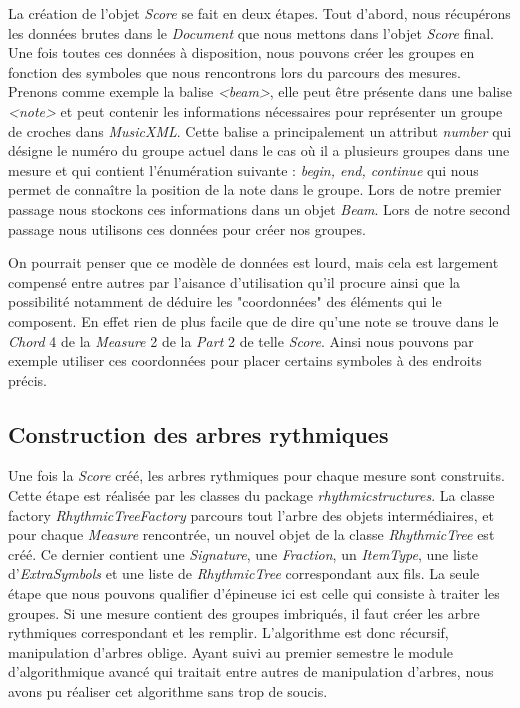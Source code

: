 \par
La création de l'objet \emph{Score} se fait en deux étapes. Tout d'abord, nous récupérons les données brutes dans le \emph{Document} que nous mettons dans l'objet \emph{Score} final. Une fois toutes ces données à disposition, nous pouvons créer les groupes en fonction des symboles que nous rencontrons lors du parcours des mesures. Prenons comme exemple la balise \emph{<beam>}, elle peut être présente dans une balise \emph{<note>} et peut contenir les informations nécessaires pour représenter un groupe de croches dans \emph{MusicXML}. Cette balise a principalement un attribut \emph{number} qui désigne le numéro du groupe actuel dans le cas où il a plusieurs groupes dans une mesure et qui contient l’énumération suivante : \emph{begin, end, continue} qui nous permet de connaître la position de la note dans le groupe. Lors de notre premier passage nous stockons ces informations dans un objet \emph{Beam}. Lors de notre second passage nous utilisons ces données pour créer nos groupes.


\par
On pourrait penser que ce modèle de données est lourd, mais cela est largement compensé entre autres par l'aisance d'utilisation qu'il procure ainsi que la possibilité notamment de déduire les "coordonnées" des éléments qui le composent. En effet rien de plus facile que de dire qu'une note se trouve dans le \emph{Chord} 4 de la \emph{Measure} 2 de la \emph{Part} 2 de telle \emph{Score}. Ainsi nous pouvons par exemple utiliser ces coordonnées pour placer certains symboles à des endroits précis.


\subsection{Construction des arbres rythmiques}

Une fois la \emph{Score} créé, les arbres rythmiques pour chaque mesure sont construits. Cette étape est réalisée par les classes du package \emph{rhythmicstructures}. La classe factory \emph{RhythmicTreeFactory} parcours tout l'arbre des objets intermédiaires, et pour chaque \emph{Measure} rencontrée, un nouvel objet de la classe \emph{RhythmicTree} est créé. Ce dernier contient une \emph{Signature}, une \emph{Fraction}, un \emph{ItemType}, une liste d'\emph{ExtraSymbols} et une liste de \emph{RhythmicTree} correspondant aux fils. La seule étape que nous pouvons qualifier d'épineuse ici est celle qui consiste à traiter les groupes. Si une mesure contient des groupes imbriqués, il faut créer les arbre rythmiques correspondant et les remplir. L'algorithme est donc récursif, manipulation d'arbres oblige. Ayant suivi au premier semestre le module d'algorithmique avancé qui traitait entre autres de manipulation d'arbres, nous avons pu réaliser cet algorithme sans trop de soucis.


